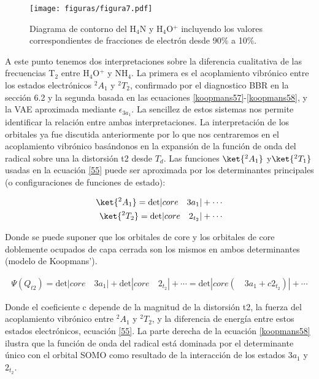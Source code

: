 \documentclass[12pt]{report}
\begin{document}
\begin{figure}[h!]
\centering
\texttt{[image: figuras/figura7.pdf]} 
\caption{Diagrama de contorno del H$_4$N y H$_4$O$^+$ incluyendo los valores correspondientes de fracciones de electrón desde 90\% a 10\%. }
\label{orbitales}
\end{figure}

\newpage

A este punto tenemos dos interpretaciones sobre la diferencia cualitativa de las frecuencias T$_2$ entre H$_4$O$^+$ y NH$_4$. La primera es el acoplamiento vibrónico entre los estados electrónicos $^2A_1$ y $^2T_2$, confirmado por el diagnostico BBR en la sección 6.2 y la segunda basada en las ecuaciones \ref{koopmans57}-\ref{koopmans58}, y la VAE aproximada mediante $\epsilon_{3a_1}$. La sencillez de estos sistemas nos permite identificar la relación entre ambas interpretaciones. La interpretación de los orbitales ya fue discutida anteriormente por lo que nos centraremos en el acoplamiento vibrónico basándonos en la expansión de la función de onda del radical sobre una la distorsión t2 desde $T_d$. Las funciones
$\ket{^2A_1}$ y$\ket{^2T_1}$ usadas en la ecuación \ref{55} puede ser aproximada por los determinantes principales (o configuraciones de funciones de estado):

\begin{ceqn}
\begin{align}
\begin{split}
\ket{^2A_1}=\text{det}|core \quad 3a_1|+\cdots\\
\ket{^2T_2}=\text{det}|core  \quad 2_{t_2}|+\cdots
\end{split}
\end{align}
\end{ceqn}

\newpage
Donde se puede suponer que los orbitales de core y los orbitales de core doblemente ocupados de capa cerrada son los mismos en ambos determinantes (modelo de Koopmans’).

\begin{align*}
\Psi	(Q_{t2})=\text{det}|core \quad 3a_1|+\text{det}|core  \quad 2_{t_2}|+\cdots=\text{det}|core (\quad 3a_1 + c 2_{t_2} )| + \cdots
\end{align*}


Donde el coeficiente c depende de la magnitud de la distorsión t2, la fuerza del acoplamiento vibrónico entre $^2A_1$ y $^2T_2$, y la diferencia de energía entre estos estados electrónicos, ecuación \ref{55}. La parte derecha de la ecuación \ref{koopmans58} ilustra que la función de onda del radical está dominada por el determinante único con el orbital SOMO como resultado de la interacción de los estados $3a_1$ y $2_{t_2}$.
\end{document}
